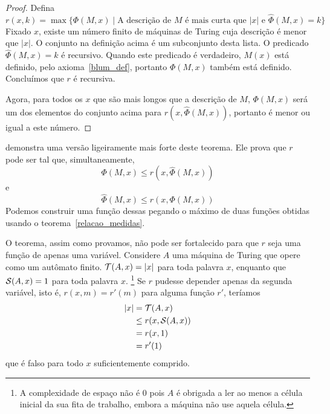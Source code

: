 \begin{proof}
    Defina
    \begin{equation*}
        r( x, k ) = \max \{ \Phi(M, x) \mid
            \text{A descrição de $M$ é mais curta que $|x|$}
            \text{ e }
            \hat \Phi(M, x) = k
        \}
    \end{equation*}
    Fixado $x$, existe um número finito de máquinas de Turing
    cuja descrição é menor que $|x|$.
    O conjunto na definição acima é um subconjunto desta lista.
    O predicado $\hat \Phi(M, x) = k$ é recursivo.
    Quando este predicado é verdadeiro,
    $M(x)$ está definido, pelo axioma~\ref{blum_def},
    portanto $\Phi(M, x)$ também está definido.
    Concluímos que $r$ é recursiva.

    Agora, para todos os $x$ que são mais longos que a descrição de $M$,
    $\Phi(M, x)$ será um dos elementos do conjunto acima
    para $r( x, \hat \Phi(M, x))$,
    portanto é menor ou igual a este número.
\end{proof}

 demonstra uma versão ligeiramente mais forte
deste teorema.
Ele prova que $r$ pode ser tal que,
simultaneamente,
\begin{equation*}
    \Phi(M, x) \leq r( x, \hat \Phi(M, x))
\end{equation*}
e
\begin{equation*}
    \hat \Phi(M, x) \leq r( x, \Phi(M, x))
\end{equation*}
Podemos construir uma função dessas
pegando o máximo de duas funções obtidas
usando o teorema~\ref{relacao_medidas}.

O teorema,
assim como provamos,
não pode ser fortalecido
para que $r$ seja uma função de apenas uma variável.
Considere $A$ uma máquina de Turing
que opere como um autômato finito.
${\mathcal{T}}(A, x) = |x|$ para toda palavra $x$,
enquanto que ${\mathcal{S}}(A, x) = 1$ para toda palavra $x$.%
\footnote{
    A complexidade de espaço não é $0$
    pois $A$ é obrigada a ler
    ao menos a célula inicial da sua fita de trabalho,
    embora a máquina não use aquela célula.
}
Se $r$ pudesse depender apenas da segunda variável,
isto é, $r(x, m) = r'(m)$ para alguma função $r'$,
teríamos
\begin{align*}
    |x| &= {\mathcal{T}}(A, x) \\
        &\leq r(x, {\mathcal{S}}(A, x)) \\
        &= r(x, 1) \\
        &= r'(1)
\end{align*}
que é falso para todo $x$ suficientemente comprido.

